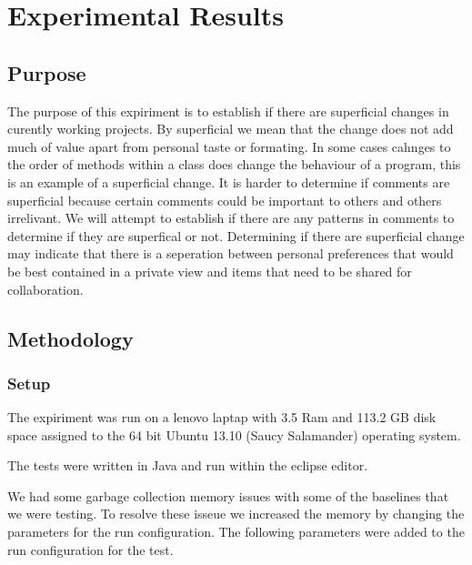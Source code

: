 
\chapter{Experimental Results}

\section{Purpose}
The purpose of this expiriment is to establish if there are superficial changes in curently working projects.  By superficial we mean that the change does not add much of value apart from personal taste or formating.  In some cases cahnges to the order of methods within a class does change the behaviour of a program, this is an example of a superficial change.  It is harder to determine if comments are superficial because certain comments could be important to others and others irrelivant. We will attempt to establish if there are any patterns in comments to determine if they are superfical or not.  Determining if there are superficial change may indicate that there is a seperation between personal preferences that would be best contained in a private view and items that need to be shared for collaboration.

\section{Methodology}
\subsection{Setup}
The expiriment was run on a lenovo laptap with 3.5 Ram and 113.2 GB disk space assigned to the 64 bit Ubuntu 13.10 (Saucy Salamander) operating system.
  

The tests were written in Java and run within the eclipse editor.

We had some garbage collection memory issues with some of the baselines that we were testing. To resolve these isseue we increased the memory by changing the parameters for the run configuration.  The following parameters were added to the run configuration for the test.

